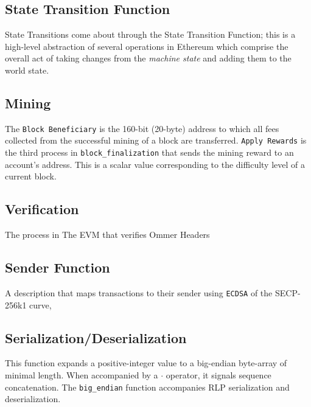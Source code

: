 \documentclass[10pt,letterpaper,leqno,bibliography=totoc]{scrartcl}
\newenvironment{alphafootnotes}
{\par\edef\savedfootnotenumber{\number\value{footnote}}
\renewcommand{\thefootnote}{\alph{footnote}}
\setcounter{footnote}{0}}
{\par\setcounter{footnote}{\savedfootnotenumber}}
\begin{document}
\begin{alphafootnotes}
\begin{multicols*}{2}
		\subsection{State Transition Function}
		State Transitions come about through the State Transition Function; this is a high-level abstraction of several operations in Ethereum which comprise the overall act of taking changes from  the \textit{machine state} and adding  them to the world state.
	
		\subsection{Mining}
			The \texttt{Block Beneficiary} is the 160-bit (20-byte) address to which all fees collected from the successful mining of a block are transferred. \texttt{Apply Rewards} is the third process in \texttt{block\_finalization} that sends the mining reward to an account's address. This is a scalar value corresponding to the difficulty level of a current block. 

		\subsection{Verification}
			The process in The EVM that verifies Ommer Headers


		\subsection{Sender Function} A description that maps transactions to their sender using \texttt{ECDSA} of the SECP-256k1 curve,

		\subsection{Serialization/Deserialization}
			This function expands a positive-integer value to a big-endian byte-array of minimal length. When accompanied by a $\cdot$ operator, it signals sequence concatenation.  The \texttt{big\_endian} function  accompanies RLP serialization and deserialization.

\end{multicols*}
\end{alphafootnotes}
\end{document}
